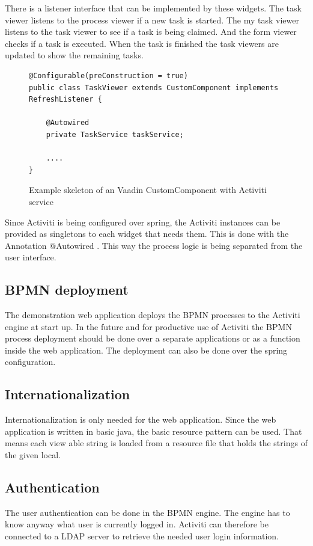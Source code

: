 \documentclass[paper=a4,twoside=false,BCOR=0mm,DIV=calc,fontsize=12pt]{scrartcl}
\begin{document}
There is a listener interface that can be implemented by these widgets. The task viewer listens to the process viewer if a new task is started. The
my task viewer listens to the task viewer to see if a task is being claimed. And the form viewer checks if a task is executed. When the task is
finished the task viewers are updated to show the remaining tasks.

\begin{figure}
    \begin{center}
\begin{verbatim}
@Configurable(preConstruction = true)
public class TaskViewer extends CustomComponent implements RefreshListener {

    @Autowired
    private TaskService taskService;

    ....
}
\end{verbatim}
  \caption{Example skeleton of an Vaadin CustomComponent with Activiti service}
   \end{center}
  \label{examplecodecomponent}
\end{figure} 

Since Activiti is being configured over spring, the Activiti instances can be provided as singletons to each widget that needs them. This is done with the Annotation @Autowired \cite{autowire}. This way the
process logic is being separated from the user interface.



\subsection{BPMN deployment}
The demonstration web application deploys the BPMN processes to the Activiti engine at start up. In the future and for productive use of Activiti the
BPMN process deployment should be done over a separate applications or as a function inside the web application. 
The deployment can also be done over the spring configuration.

\subsection{Internationalization}
Internationalization is only needed for the web application. Since the web application is written in basic java, the basic resource pattern can be used. That means each view able string is loaded from a resource file that holds the strings of the given local. 



\subsection{Authentication}
The user authentication can be done in the BPMN engine. The engine has to know anyway what user is currently logged in. Activiti can therefore be connected to a LDAP server to retrieve the needed user login information.
\end{document}
